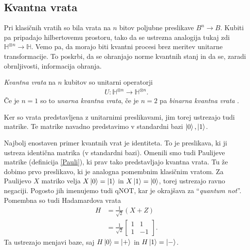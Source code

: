 \documentclass[mat1]{fmfdelo}
\newcommand{\Hb}{\mathbb H}
\begin{document}
\subsection{Kvantna vrata} Pri klasičnih vratih so bila vrata na \(n\) bitov poljubne preslikave \(B^n\to B\). Kubiti pa pripadajo hilbertovemu prostoru, tako da se ustrezna analogija tukaj zdi \(\Hb^{\otimes n}\to \Hb\). Vemo pa, da morajo biti kvantni procesi brez meritev unitarne transformacije. To poskrbi, da se ohranjajo norme kvantnih stanj in da se, zaradi obrnljivosti, informacija ohranja. 
\begin{definicija}
    \emph{Kvantna vrata} na \(n\) kubitov so unitarni operatorji
    \begin{align*}
        U:\Hb^{\otimes n}\to \Hb^{\otimes n}.
    \end{align*}
    Če je \(n=1\) so to \emph{unarna kvantna vrata}, če je \(n=2\) pa \emph{binarna kvantna vrata} \cite[Definicija 5.7]{mathforqm}.
\end{definicija}
Ker so vrata predstavljena z unitarnimi preslikavami, jim torej ustrezajo tudi matrike. Te matrike navadno predstavimo v standardni bazi \(\ket0, \ket1\).

Najbolj enostaven primer kvantnih vrat je identiteta. To je preslikava, ki ji ustreza identična matrika (v standardni bazi). Omenili smo tudi Paulijeve matrike (definicija \ref{Pauli}), ki prav tako predstavljajo kvantna vrata. Tu že dobimo prvo preslikavo, ki je analogna pomembnim klasičnim vratom. Za Paulijevo \(X\) matriko velja \(X\ket0=\ket1\) in \(X\ket1=\ket0\), torej ustrezajo ravno negaciji. Pogosto jih imenujemo tudi \textsf{qNOT}, kar je okrajšava za ``\emph{quantum not}''. Pomembna so tudi Hadamardova vrata
\begin{align*}
    H &= \frac{1}{\sqrt{2}}(X+Z)\\
      &= \frac{1}{\sqrt2} \begin{bmatrix}
        1&1\\1&-1
    \end{bmatrix}.
\end{align*}
Ta ustrezajo menjavi baze, saj \(H\ket0=\ket+\) in \(H\ket1=\ket-\). 
\end{document}
